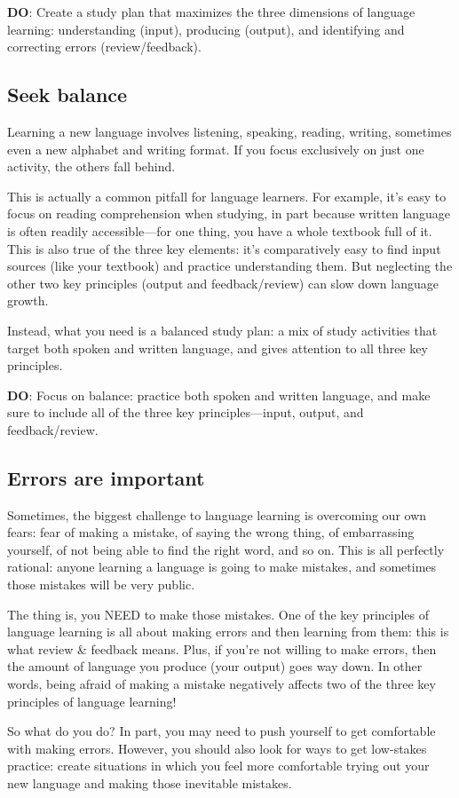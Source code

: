\documentclass[../main.tex]{subfiles}
\begin{document}
\textbf{DO}: Create a study plan that maximizes the three dimensions of language
learning: understanding (input), producing (output), and identifying and
correcting errors (review/feedback).
%
\subsection{Seek balance}
Learning a new language involves listening, speaking, reading, writing,
sometimes even a new alphabet and writing format. If you focus exclusively on
just one activity, the others fall behind.

This is actually a common pitfall for language learners. For example, it's easy
to focus on reading comprehension when studying, in part because written
language is often readily accessible—for one thing, you have a whole textbook
full of it. This is also true of the three key elements: it's comparatively easy
to find input sources (like your textbook) and practice understanding them. But
neglecting the other two key principles (output and feedback/review) can slow
down language growth.

Instead, what you need is a balanced study plan: a mix of study activities that
target both spoken and written language, and gives attention to all three key
principles.

\textbf{DO}: Focus on balance: practice both spoken and written language, and
make sure to include all of the three key principles—input, output, and
feedback/review.
%
\subsection{Errors are important}
Sometimes, the biggest challenge to language learning is overcoming our own
fears: fear of making a mistake, of saying the wrong thing, of embarrassing
yourself, of not being able to find the right word, and so on. This is all
perfectly rational: anyone learning a language is going to make mistakes, and
sometimes those mistakes will be very public.

The thing is, you NEED to make those mistakes. One of the key principles of
language learning is all about making errors and then learning from them: this
is what review \& feedback means. Plus, if you're not willing to make errors,
then the amount of language you produce (your output) goes way down. In other
words, being afraid of making a mistake negatively affects two of the three key
principles of language learning!

So what do you do? In part, you may need to push yourself to get comfortable
with making errors. However, you should also look for ways to get low-stakes
practice: create situations in which you feel more comfortable trying out your
new language and making those inevitable mistakes.
\end{document}
